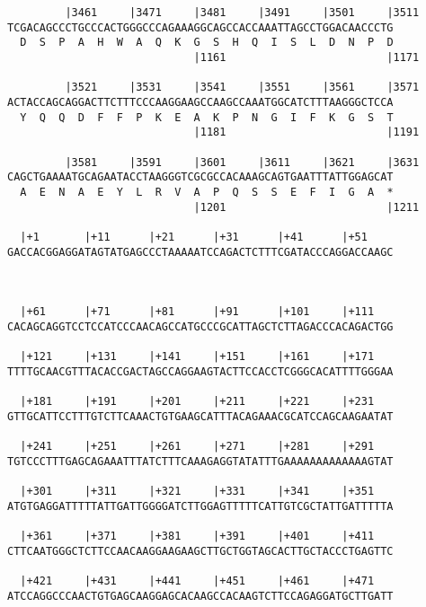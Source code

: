 \documentclass{article}
\begin{document}
\begin{Verbatim}
         |3461     |3471     |3481     |3491     |3501     |3511
TCGACAGCCCTGCCCACTGGGCCCAGAAAGGCAGCCACCAAATTAGCCTGGACAACCCTG
  D  S  P  A  H  W  A  Q  K  G  S  H  Q  I  S  L  D  N  P  D
                             |1161                         |1171
  
         |3521     |3531     |3541     |3551     |3561     |3571
ACTACCAGCAGGACTTCTTTCCCAAGGAAGCCAAGCCAAATGGCATCTTTAAGGGCTCCA
  Y  Q  Q  D  F  F  P  K  E  A  K  P  N  G  I  F  K  G  S  T
                             |1181                         |1191
  
         |3581     |3591     |3601     |3611     |3621     |3631
CAGCTGAAAATGCAGAATACCTAAGGGTCGCGCCACAAAGCAGTGAATTTATTGGAGCAT
  A  E  N  A  E  Y  L  R  V  A  P  Q  S  S  E  F  I  G  A  *
                             |1201                         |1211
  
  |+1       |+11      |+21      |+31      |+41      |+51    
GACCACGGAGGATAGTATGAGCCCTAAAAATCCAGACTCTTTCGATACCCAGGACCAAGC
   
                                                            
  
  |+61      |+71      |+81      |+91      |+101     |+111   
CACAGCAGGTCCTCCATCCCAACAGCCATGCCCGCATTAGCTCTTAGACCCACAGACTGG
                                                            
  |+121     |+131     |+141     |+151     |+161     |+171   
TTTTGCAACGTTTACACCGACTAGCCAGGAAGTACTTCCACCTCGGGCACATTTTGGGAA
                                                            
  |+181     |+191     |+201     |+211     |+221     |+231   
GTTGCATTCCTTTGTCTTCAAACTGTGAAGCATTTACAGAAACGCATCCAGCAAGAATAT
                                                            
  |+241     |+251     |+261     |+271     |+281     |+291   
TGTCCCTTTGAGCAGAAATTTATCTTTCAAAGAGGTATATTTGAAAAAAAAAAAAAGTAT
                                                            
  |+301     |+311     |+321     |+331     |+341     |+351   
ATGTGAGGATTTTTATTGATTGGGGATCTTGGAGTTTTTCATTGTCGCTATTGATTTTTA
                                                            
  |+361     |+371     |+381     |+391     |+401     |+411   
CTTCAATGGGCTCTTCCAACAAGGAAGAAGCTTGCTGGTAGCACTTGCTACCCTGAGTTC
                                                            
  |+421     |+431     |+441     |+451     |+461     |+471   
ATCCAGGCCCAACTGTGAGCAAGGAGCACAAGCCACAAGTCTTCCAGAGGATGCTTGATT
                                                            

\end{Verbatim}
\end{document}
